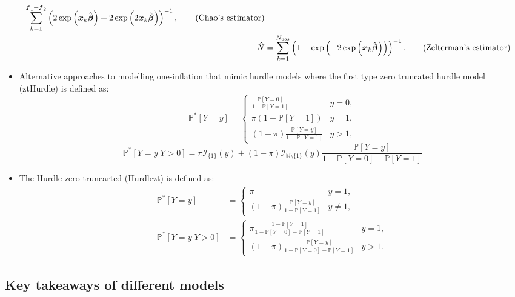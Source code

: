 \documentclass[
]{jss}
\newcommand{\1}{\mathcal{I}} \newcommand{\bZero}{\boldsymbol{0}}
\newcommand{\bx}{\boldsymbol{x}} \newcommand{\bX}{\boldsymbol{X}}
\newcommand{\bbeta}{\boldsymbol{\beta}}
\begin{document}
\begin{itemize}
\begin{align}
        \sum_{k=1}^{\boldsymbol{f}_{1}+\boldsymbol{f}_{2}}
        \left(2\exp\left(\bx_{k}\hat{\bbeta}\right)+
        2\exp\left(2\bx_{k}\hat{\bbeta}\right)\right)^{-1},
        \tag{\text{Chao's estimator}}\\
        \hat{N}&=\sum_{k=1}^{N_{obs}}
        \left(1-\exp\left(-2\exp\left(\bx_{k}\hat{\bbeta}\right)\right)\right)^{-1}.
        \tag{\text{Zelterman's estimator}}
    \end{align}
    \item Alternative approaches to modelling one-inflation that mimic hurdle models where the first type zero truncated hurdle model (ztHurdle) is defined as:
    \begin{equation*}
        \mathbb{P}^{\ast}[Y=y]=\begin{cases}
        \frac{\mathbb{P}[Y=0]}{1-\mathbb{P}[Y=1]} & y=0, \\
        \pi(1-\mathbb{P}[Y=1]) & y=1, \\
        (1-\pi) \frac{\mathbb{P}[Y=y]}{1-\mathbb{P}[Y=1]} & y>1,
        \end{cases}
    \end{equation*}
    \begin{equation*}
        \mathbb{P}^{\ast}[Y=y|Y>0]=\pi\1_{\{1\}}(y)+
        (1-\pi)\1_{\mathbb{N}\setminus\{1\}}(y)\frac{\mathbb{P}[Y=y]}{1-\mathbb{P}[Y=0]-\mathbb{P}[Y=1]}
    \end{equation*}
    \item The Hurdle zero truncarted (Hurdlezt) is defined as:
    \begin{align*}
        \mathbb{P}^{\ast}[Y=y]&=\begin{cases}
        \pi & y=1, \\
        (1-\pi) \frac{\mathbb{P}[Y=y]}{1-\mathbb{P}[Y=1]} & y\neq1,
        \end{cases}\\
        \mathbb{P}^{\ast}[Y=y|Y>0]&=\begin{cases}
            \pi\frac{1-\mathbb{P}[Y=1]}{1-\mathbb{P}[Y=0]-\mathbb{P}[Y=1]} & y=1,\\
            (1-\pi)\frac{\mathbb{P}[Y=y]}{1-\mathbb{P}[Y=0]-\mathbb{P}[Y=1]} & y>1.
        \end{cases}
    \end{align*}
\end{itemize}

\subsection{Key takeaways of different
models}\label{key-takeaways-of-different-models}
\end{document}
